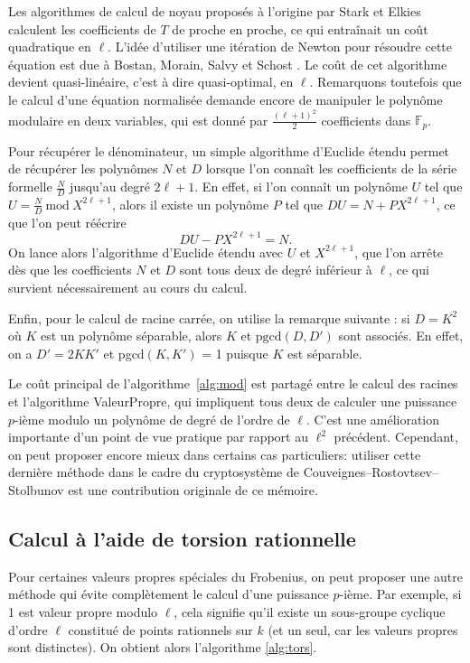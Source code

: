 \documentclass[11pt,a4paper]{article}
\newcommand{\F}{\mathbb{F}}
\renewcommand{\mod}{\ \mathrm{mod}\ }
\renewcommand{\v}{\vspace{5mm}}
\theoremstyle{definition}
\begin{document}
Les algorithmes de calcul de noyau proposés à l'origine par Stark et Elkies calculent les coefficients de $T$ de proche en proche, ce qui entraînait un coût quadratique en $\ell$. L'idée d'utiliser une itération de Newton pour résoudre cette équation est due à Bostan, Morain, Salvy et Schost \cite{BMSS}. Le coût de cet algorithme devient quasi-linéaire, c'est à dire quasi-optimal, en $\ell$. Remarquons toutefois que le calcul d'une équation normalisée demande encore de manipuler le polynôme modulaire en deux variables, qui est donné par $\frac{(\ell + 1)^2}{2}$ coefficients dans $\F_p$.

\v

 Pour récupérer le dénominateur, un simple algorithme d'Euclide étendu permet de récupérer les polynômes $N$ et $D$ lorsque l'on connaît les coefficients de la série formelle $\frac{N}{D}$ jusqu'au degré $2\ell + 1$. En effet, si l'on connaît un polynôme $U$ tel que $U = \frac{N}{D} \mod X^{2\ell + 1}$, alors il existe un polynôme $P$ tel que $D U = N + P X^{2\ell+1}$, ce que l'on peut réécrire
 $$D U - P X^{2\ell + 1} = N.$$
On lance alors l'algorithme d'Euclide étendu avec $U$ et $X^{2\ell + 1}$, que l'on arrête dès que les coefficients $N$ et $D$ sont tous deux de degré inférieur à $\ell$, ce qui survient nécessairement au cours du calcul.

Enfin, pour le calcul de racine carrée, on utilise la remarque suivante : si $D = K^2$ où $K$ est un polynôme séparable, alors $K$ et $\mathrm{pgcd}(D, D')$ sont associés. En effet, on a $D' = 2 K K'$ et pgcd$(K, K')$ = 1 puisque $K$ est séparable.
\v

Le coût principal de l'algorithme~\ref{alg:mod} est partagé entre le calcul des racines et l'algorithme {\sc ValeurPropre}, qui impliquent tous deux de calculer une puissance $p$-ième modulo un polynôme de degré de l'ordre de $\ell$. C'est une amélioration importante d'un point de vue pratique par rapport au $\ell^2$ précédent. Cependant, on peut proposer encore mieux dans certains cas particuliers: utiliser cette dernière méthode dans le cadre du cryptosystème de Couveignes--Rostovtsev--Stolbunov est une contribution originale de ce mémoire.

\subsection{Calcul à l'aide de torsion rationnelle}

Pour certaines valeurs propres spéciales du Frobenius, on peut proposer une autre méthode qui évite complètement le calcul d'une puissance $p$-ième. Par exemple, si 1 est valeur propre modulo $\ell$, cela signifie qu'il existe un sous-groupe cyclique d'ordre $\ell$ constitué de points rationnels sur $k$ (et un seul, car les valeurs propres sont distinctes). On obtient alors l'algorithme \ref{alg:tors}.
\end{document}
